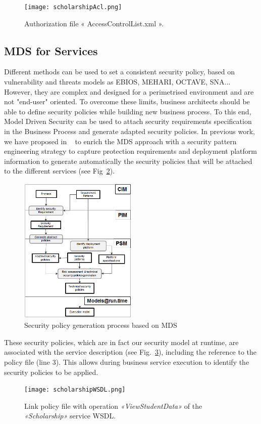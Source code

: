 \documentclass[runningheads,a4paper]{llncs}
\begin{document}
 
\begin{figure}
\centering
\texttt{[image: scholarshipAcl.png]}
\caption{Authorization file « AccessControlList.xml ».}
\label{fig:acl}
\end{figure}


\subsection{MDS for Services}

Different methods can be used to set a consistent security policy, based on vulnerability and threats models as EBIOS, MEHARI, OCTAVE, SNA... However, they are complex and designed for a perimetrised environment and are not "end-user" oriented. To overcome these limits, business architects should be able to define security policies while building new business process. To this end, Model Driven Security can be used to attach security requirements specification in the Business Process and generate adapted security policies. In previous work, we have proposed in ~\cite{OBG12} to enrich the MDS approach with a security pattern engineering strategy to capture protection requirements and deployment platform information to generate automatically the security policies that will be attached to the different services (see Fig~\ref{fig:mds}).

\begin{figure}  

\centering
\includegraphics[height=200pt, width=160pt]{mds.png}
\caption{Security policy generation process based on MDS}
\label{fig:mds}
\end{figure}

These security policies, which are in fact our security model at runtime, are associated with the service description (see Fig.~\ref{fig:wsdl}), including the reference to the policy file (line 3). This allows during business service execution to identify the security policies to be applied.
\begin{figure}  
\centering
\texttt{[image: scholarshipWSDL.png]}
\caption{Link policy file with operation \emph{«ViewStudentData»} of the \emph{«Scholarship»} service WSDL.}
\label{fig:wsdl}
\end{figure}
\end{document}
